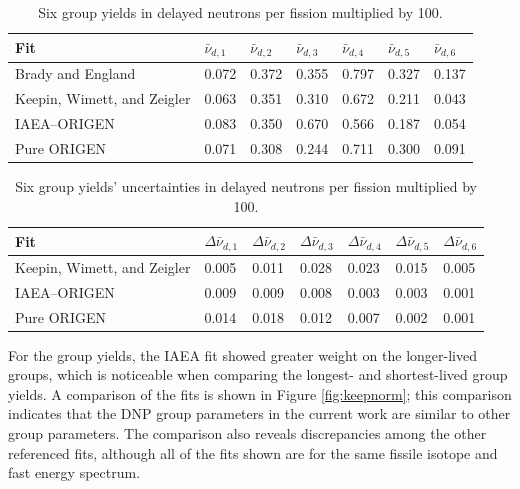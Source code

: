 \documentclass{style/nseJournal}
\begin{document}
\begin{table}[]
\caption{Six group yields in delayed neutrons per fission multiplied by 100.}
\centering
\begin{tabular}{|l l l l l l l|} 
 \hline
 Fit & $\bar{\nu}_{d, 1}$ & $\bar{\nu}_{d, 2}$ & $\bar{\nu}_{d, 3}$ & $\bar{\nu}_{d, 4}$ & $\bar{\nu}_{d, 5}$ & $\bar{\nu}_{d, 6}$\\
 \hline\hline
    Brady and England \cite{doi:10.13182/NSE103-129} & 0.072 & 0.372 & 0.355 & 0.797 & 0.327 & 0.137\\
    Keepin, Wimett, and Zeigler \cite{KEEPIN1957IN2} & 0.063 & 0.351 & 0.310 & 0.672 & 0.211 & 0.043 \\
    IAEA--ORIGEN & 0.083 & 0.350 & 0.670 & 0.566 & 0.187 & 0.054 \\
    Pure ORIGEN & 0.071 & 0.308 & 0.244 & 0.711 & 0.300 & 0.091\\
 \hline
\end{tabular}
\label{table:group-yields}
\end{table}

\begin{table}[]
\caption{Six group yields' uncertainties in delayed neutrons per fission multiplied by 100.}
\centering
\begin{tabular}{|l l l l l l l|} 
 \hline
 Fit & $\Delta \bar{\nu}_{d, 1}$ & $\Delta \bar{\nu}_{d, 2}$ & $\Delta \bar{\nu}_{d, 3}$ & $\Delta \bar{\nu}_{d, 4}$ & $\Delta \bar{\nu}_{d, 5}$ & $\Delta \bar{\nu}_{d, 6}$\\
 \hline\hline
    Keepin, Wimett, and Zeigler \cite{KEEPIN1957IN2} & 0.005 & 0.011 & 0.028 & 0.023 & 0.015 & 0.005\\
    IAEA--ORIGEN & 0.009 & 0.009 & 0.008 & 0.003 & 0.003 & 0.001 \\
    Pure ORIGEN& 0.014 & 0.018 & 0.012 & 0.007 & 0.002 & 0.001\\
 \hline
\end{tabular}
\label{table:group-yields-delta}
\end{table}


For the group yields, the IAEA fit showed greater weight on the longer-lived groups, which is noticeable when comparing the longest- and shortest-lived group yields. A comparison of the fits is shown in Figure \ref{fig:keepnorm}; this comparison indicates that the DNP group parameters in the current work are similar to other group parameters. The comparison also reveals discrepancies among the other referenced fits, although all of the fits shown are for the same fissile isotope and fast energy spectrum.
\end{document}
